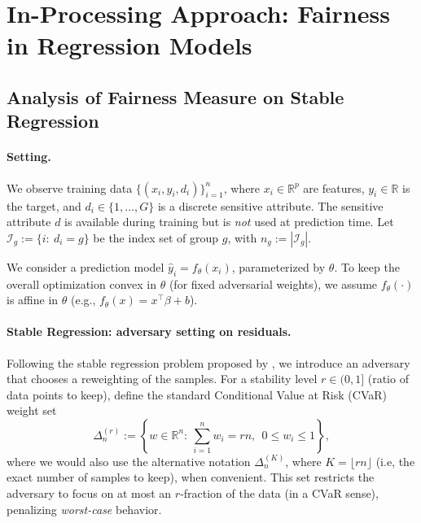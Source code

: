 \documentclass{article}
\begin{document}
\section{In-Processing Approach: Fairness in Regression Models}

%

\subsection{Analysis of Fairness Measure on Stable Regression}


\paragraph{Setting.}
We observe training data $\{(x_i,y_i,d_i)\}_{i=1}^n$, where $x_i\in\mathbb{R}^p$ are features,
$y_i\in\mathbb{R}$ is the target, and $d_i\in\{1,\dots,G\}$ is a discrete sensitive attribute.
The sensitive attribute $d$ is available during training but is \emph{not} used at prediction time.
Let $\mathcal{I}_g:=\{i:\ d_i=g\}$ be the index set of group $g$, with $n_g:=|\mathcal{I}_g|$. %

We consider a prediction model $\hat y_i = f_\theta(x_i)$, parameterized by $\theta$.
To keep the overall optimization convex in $\theta$ (for fixed adversarial weights), we assume
$f_\theta(\cdot)$ is affine in $\theta$ (e.g., $f_\theta(x)=x^\top\beta+b$).

\paragraph{Stable Regression: adversary setting on residuals.}
Following the stable regression problem proposed by \cite{BertsimasPaskov2020}, we introduce an adversary that chooses a reweighting of the samples.
For a stability level $r\in(0,1]$ (ratio of data points to keep), define the standard Conditional Value at Risk (CVaR) weight set
\begin{equation}
\Delta_n^{(r)}
:=\left\{w\in\mathbb{R}^n:\ \sum_{i=1}^n w_i=r n,\ \ 0\le w_i \le 1\right\},
\label{eq:Walpha}
\end{equation}
where we would also use the alternative notation $\Delta_{n}^{(K)}$, where $K=\lfloor rn \rfloor$ (i.e, the exact number of samples to keep), when convenient.
This set restricts the adversary to focus on at most an $r$-fraction of the data (in a CVaR sense),
penalizing \emph{worst-case} behavior.
\end{document}

